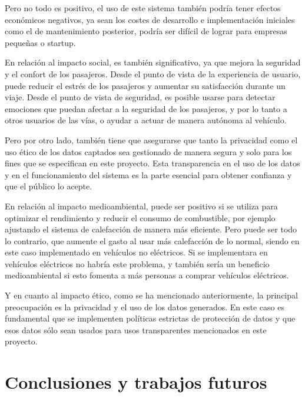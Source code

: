\documentclass[12pt]{report} %
\begin{document}
Pero no todo es positivo, el uso de este sistema también podría tener efectos económicos negativos, ya sean los costes de desarrollo e implementación iniciales como el de mantenimiento posterior, podría ser difícil de lograr para empresas pequeñas o startup.

En relación al impacto social, es también significativo, ya que mejora la seguridad y el confort de los pasajeros. Desde el punto de vista de la experiencia de usuario, puede reducir el estrés de los pasajeros y aumentar su satisfacción durante un viaje. Desde el punto de vista de seguridad, es posible usarse para detectar emociones que puedan afectar a la seguridad de los pasajeros, y por lo tanto a otros usuarios de las vías, o ayudar a actuar de manera autónoma al vehículo.

Pero por otro lado, también tiene que asegurarse que tanto la privacidad como el uso ético de los datos captados sea gestionado de manera segura y solo para los fines que se especifican en este proyecto. Esta transparencia en el uso de los datos y en el funcionamiento del sistema es la parte esencial para obtener confianza y que el público lo acepte.

En relación al impacto medioambiental, puede ser positivo si se utiliza para optimizar el rendimiento y reducir el consumo de combustible, por ejemplo ajustando el sistema de calefacción de manera más eficiente. Pero puede ser todo lo contrario, que aumente el gasto al usar más calefacción de lo normal, siendo en este caso implementado en vehículos no eléctricos. Si se implementara en vehículos eléctricos no habría este problema, y también sería un beneficio medioambiental si esto fomenta a más personas a comprar vehículos eléctricos.

Y en cuanto al impacto ético, como se ha mencionado anteriormente, la principal preocupación es la privacidad y el uso de los datos generados. En este caso es fundamental que se implementen políticas estrictas de protección de datos y que esos datos sólo sean usados para usos transparentes mencionados en este proyecto.



\chapter{Conclusiones y trabajos futuros}




\end{document}
